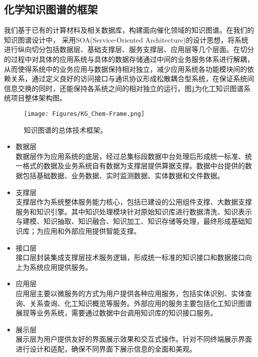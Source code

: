 \subsection{化学知识图谱的框架}
我们基于已有的计算材料及相关数据库，构建面向催化领域的知识图谱。在我们的知识图谱设计中，%
采用\textrm{SOA(Service-Oriented Architecture)}的设计思想，将系统进行纵向切分包括数据层、基础支撑层、服务支撑层、应用层等几个层面。在切分的过程中对具体的应用系统与具体的数据存储通过中间的业务服务体系进行解耦，从而使得系统中的业务应用与数据保持相对独立，减少应用系统各功能模块间的依赖关系，通过定义良好的访问接口与通讯协议形成松散耦合型系统，在保证系统间信息交换的同时，还能保持各系统之间的相对独立的运行。图\ref{KG_Chem-Frame}为化工知识图谱系统项目整体架构图。
\begin{figure}[h!]
\centering
\texttt{[image: Figures/KG\_Chem-Frame.png]}
\caption{知识图谱的总体技术框架。}%
\label{KG_Chem-Frame}
\end{figure} 
\begin{itemize}
	\item 数据层\\ 
数据层作为应用系统的底层，经过总集标段数据中台处理后形成统一标准、统一格式的数据及业务系统自有数据为支撑层提供算据支撑。数据中台提供的数据包括基础数据、业务数据、实时监测数据、实体数据和文件数据。
\item 支撑层\\ 
支撑层作为系统整体服务能力核心，包括已建设的公用组件支撑、大数据支撑服务和知识引擎。其中知识处理模块针对原始知识库进行数据清洗、知识表示与建模、知识抽取、知识融合、知识加工、知识存储等处理，最终形成基础知识库；为应用和外部应用提供智能支撑。
\item 接口层\\ 
接口层封装集成支撑层技术服务逻辑，形成统一标准的知识接口和数据接口向上为系统应用提供服务。
\item 应用层\\ 
应用层主要以微服务的方式为用户提供各种应用服务，包括实体识别、实体查询、关系查询、化工知识概览等服务。外部应用的服务主要包括化工知识图谱展现等业务系统，需要通过数据中台调用知识库的知识接口服务。
\item 展示层\\
展示层为用户提供友好的界面展示效果和交互式操作。针对不同终端展示界面进行设计和适配，确保不同界面下展示信息的全面和美观。 
\end{itemize}

